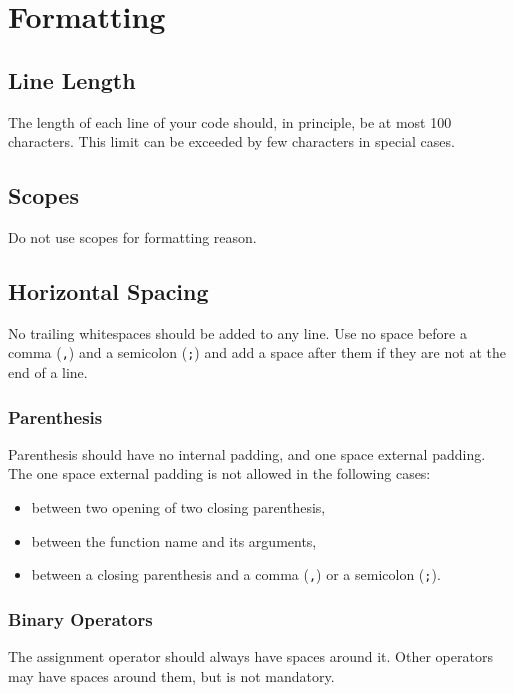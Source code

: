 \documentclass[a4paper]{article}
\newcommand{\inlinecode}[1]{\lstinline|#1|}
\begin{document}
\section{Formatting}

\subsection{Line Length}

The length of each line of your code should, in principle, be at most 100 characters. This limit can be exceeded by few characters in special cases.

\subsection{Scopes}

Do not use scopes for formatting reason.

\subsection{Horizontal Spacing}

No trailing whitespaces should be added to any line.
Use no space before a comma (\inlinecode{,}) and a semicolon (\inlinecode{;}) and add a space after them if they are not at the end of a line.

\subsubsection{Parenthesis}

Parenthesis should have no internal padding, and one space external padding.
The one space external padding is not allowed in the following cases:
\begin{itemize} \itemsep -3pt
 \vspace{-2ex}
 \item between two opening of two closing parenthesis,
 \item between the function name and its arguments,
 \item between a closing parenthesis and a comma (\inlinecode{,}) or a semicolon (\inlinecode{;}).
\end{itemize}

\subsubsection{Binary Operators}

The assignment operator should always have spaces around it. Other operators may have spaces around them, but is not mandatory.
\end{document}
